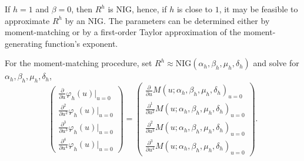 If $h=1$ and $\beta=0$, then $R^h$ is NIG, hence, if $h$ is close to
$1$, it may be feasible to approximate $R^h$ by an NIG. The parameters
can be determined either by moment-matching or by a first-order Taylor
approximation of the moment-generating function's exponent.


For the moment-matching procedure, set
$R^h\approx \text{NIG}(\alpha_h, \beta_h, \mu_h, \delta_h)$ and solve
for $\alpha_h, \beta_h, \mu_h, \delta_h$, 
\begin{equation*}
  \begin{pmatrix}
    \frac{\partial}{\partial u} \varphi_h(u)\big|_{u=0}\\[5pt]
    \frac{\partial^2}{\partial u^2} \varphi_h(u)\big|_{u=0}\\[5pt]
    \frac{\partial^3}{\partial u^3} \varphi_h(u)\big|_{u=0}\\[5pt]
    \frac{\partial^4}{\partial u^4} \varphi_h(u)\big|_{u=0}
  \end{pmatrix}
  =
  \begin{pmatrix}
    \frac{\partial}{\partial u} M(u;\alpha_h, \beta_h, \mu_h,
    \delta_h)_{u=0}\\[5pt]
    \frac{\partial^1}{\partial u^2} M(u;\alpha_h, \beta_h, \mu_h,
    \delta_h)_{u=0}\\[5pt]
    \frac{\partial^2}{\partial u^3} M(u;\alpha_h, \beta_h, \mu_h,
    \delta_h)_{u=0}\\[5pt]
    \frac{\partial^3}{\partial u^4} M(u;\alpha_h, \beta_h, \mu_h,
    \delta_h)_{u=0}
  \end{pmatrix}.
\end{equation*}

